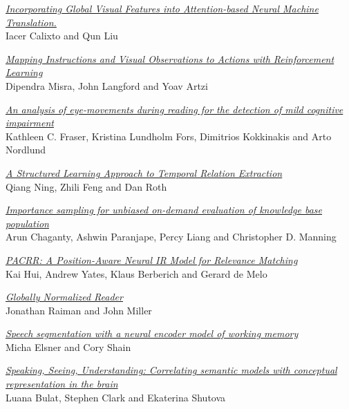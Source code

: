 \hyperlink{page.1001}{\em Incorporating Global Visual Features into Attention-based Neural Machine Translation.}\samepage \\
\hspace*{7mm} Iacer Calixto and Qun Liu\dotfill {}

\hyperlink{page.1013}{\em Mapping Instructions and Visual Observations to Actions with Reinforcement Learning}\samepage \\
\hspace*{7mm} Dipendra Misra, John Langford and Yoav Artzi\dotfill {}

\hyperlink{page.1025}{\em An analysis of eye-movements during reading for the detection of mild cognitive impairment}\samepage \\
\hspace*{7mm} Kathleen C. Fraser, Kristina Lundholm Fors, Dimitrios Kokkinakis and Arto Nordlund\dotfill {}

\hyperlink{page.1036}{\em A Structured Learning Approach to Temporal Relation Extraction}\samepage \\
\hspace*{7mm} Qiang Ning, Zhili Feng and Dan Roth\dotfill {}

\hyperlink{page.1047}{\em Importance sampling for unbiased on-demand evaluation of knowledge base population}\samepage \\
\hspace*{7mm} Arun Chaganty, Ashwin Paranjape, Percy Liang and Christopher D. Manning\dotfill {}

\hyperlink{page.1058}{\em PACRR: A Position-Aware Neural IR Model for Relevance Matching}\samepage \\
\hspace*{7mm} Kai Hui, Andrew Yates, Klaus Berberich and Gerard de Melo\dotfill {}

\hyperlink{page.1068}{\em Globally Normalized Reader}\samepage \\
\hspace*{7mm} Jonathan Raiman and John Miller\dotfill {}

\hyperlink{page.1079}{\em Speech segmentation with a neural encoder model of working memory}\samepage \\
\hspace*{7mm} Micha Elsner and Cory Shain\dotfill {}

\hyperlink{page.1090}{\em Speaking, Seeing, Understanding: Correlating semantic models with conceptual representation in the brain}\samepage \\
\hspace*{7mm} Luana Bulat, Stephen Clark and Ekaterina Shutova\dotfill {}

